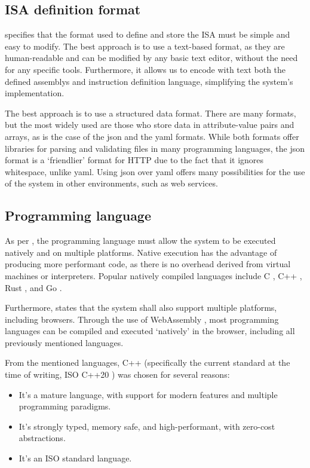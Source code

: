 \subsection{ISA definition format}\label{subsec:isa-format-study}
 specifies that the format used to define and store the \gls{ISA} must be simple and easy to modify. The best approach is to use a text-based format, as they are human-readable and can be modified by any basic text editor, without the need for any specific tools. Furthermore, it allows us to encode with text  both the defined \glspl{assembly} and \gls{instruction} definition language, simplifying the system's implementation.

The best approach is to use a structured data format. There are many formats, but the most widely used are those who store data in attribute-value pairs and arrays, as is the case of the \gls{json} \parencite{ISO21778} and the \gls{yaml} \parencite{yamlspec} formats. While both formats offer libraries for parsing and validating files in many programming languages, the \gls{json} format is a `friendlier' format for \gls{HTTP} due to the fact that it ignores whitespace, unlike \gls{yaml}. Using \gls{json} over \gls{yaml} offers many possibilities for the use of the system in other environments, such as \glspl{web service}.


\subsection{Programming language}\label{subsec:language-study}
As per , the \gls{programming language} must allow the system to be executed natively and on multiple platforms. Native execution has the advantage of producing more performant code, as there is no overhead derived from virtual machines or \glspl{interpreter}. Popular natively compiled languages include C \parencite{KernighanBrianW1988TCpl}, C++ \parencite{StroustrupBjarne2013TCpl}, Rust \parencite{KlabnikSteve2023TRpl}, and Go \parencite{DonovanAlan2015TGPL} \parencite{statista2023langstats}.

Furthermore,  states that the system shall also support multiple platforms, including browsers. Through the use of WebAssembly \parencite{HaasAndreas2017Btwu}, most programming languages can be compiled and executed `natively' in the browser, including all previously mentioned languages.

From the mentioned languages, C++ (specifically the current standard at the time of writing, ISO C++20 \parencite{ISOcpp20}) was chosen for several reasons:
\begin{itemize}[nosep]
  \item It's a mature language, with support for modern features and multiple \glspl{programming paradigm}.
  \item It's strongly typed, memory safe, and high-performant, with zero-cost abstractions.  %
  \item It's an ISO standard language.
\end{itemize}



